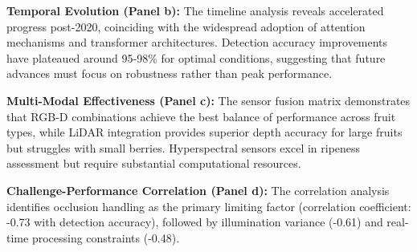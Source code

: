 \documentclass[a4paper,fleqn]{cas-dc}
\begin{document}
\textbf{Temporal Evolution (Panel b):} The timeline analysis reveals accelerated progress post-2020, coinciding with the widespread adoption of attention mechanisms and transformer architectures. Detection accuracy improvements have plateaued around 95-98\% for optimal conditions, suggesting that future advances must focus on robustness rather than peak performance.

\textbf{Multi-Modal Effectiveness (Panel c):} The sensor fusion matrix demonstrates that RGB-D combinations achieve the best balance of performance across fruit types, while LiDAR integration provides superior depth accuracy for large fruits but struggles with small berries. Hyperspectral sensors excel in ripeness assessment but require substantial computational resources.

\textbf{Challenge-Performance Correlation (Panel d):} The correlation analysis identifies occlusion handling as the primary limiting factor (correlation coefficient: -0.73 with detection accuracy), followed by illumination variance (-0.61) and real-time processing constraints (-0.48).
\end{document}
